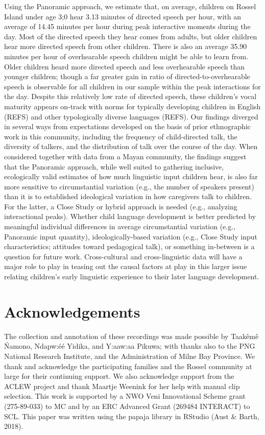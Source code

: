 \documentclass[,man,floatsintext]{apa6}
\begin{document}
Using the Panoramic approach, we estimate that, on average, children on
Rossel Island under age 3;0 hear 3.13 minutes of directed speech per
hour, with an average of 14.45 minutes per hour during peak interactive
moments during the day. Most of the directed speech they hear comes from
adults, but older children hear more directed speech from other
children. There is also an average 35.90 minutes per hour of
overhearable speech children might be able to learn from. Older children
heard more directed speech and less overhearable speech than younger
children; though a far greater gain in ratio of directed-to-overhearable
speech is observable for all children in our sample within the peak
interactions for the day. Despite this relatively low rate of directed
speech, these children's vocal maturity appears on-track with norms for
typically developing children in English (REFS) and other typologically
diverse languages (REFS). Our findings diverged in several ways from
expectations developed on the basis of prior ethnographic work in this
community, including the frequency of child-directed talk, the diversity
of talkers, and the distribution of talk over the course of the day.
When considered together with data from a Mayan community, the findings
suggest that the Panoramic approach, while well suited to gathering
inclusive, ecologically valid estimates of how much linguistic input
children hear, is also far more sensitive to circumstantial variation
(e.g., the number of speakers present) than it is to established
ideological variation in how caregivers talk to children. For the
latter, a Close Study or hybrid approach is needed (e.g., analyzing
interactional peaks). Whether child language development is better
predicted by meaningful individual differences in average circumstantial
variation (e.g., Panoramic input quantity), ideologically-based
variation (e.g., Close Study input characteristics; attitudes toward
pedagogical talk), or something in-between is a question for future
work. Cross-cultural and cross-linguistic data will have a major role to
play in teasing out the causal factors at play in this larger issue
relating children's early linguistic experience to their later language
development.

\section{Acknowledgements}\label{acknowledgements}

The collection and annotation of these recordings was made possible by
Taakêmê Ńamono, Ndapw:éé Yidika, and Y:aaw:aa Pikuwa; with thanks also
to the PNG National Research Institute, and the Administration of Milne
Bay Province. We thank and acknowledge the participating families and
the Rossel community at large for their continuing support. We also
acknowledge support from the ACLEW project and thank Maartje Weenink for
her help with manual clip selection. This work is supported by a NWO
Veni Innovational Scheme grant (275-89-033) to MC and by an ERC Advanced
Grant (269484 INTERACT) to SCL. This paper was written using the papaja
library in RStudio (Aust \& Barth, 2018).
\end{document}
